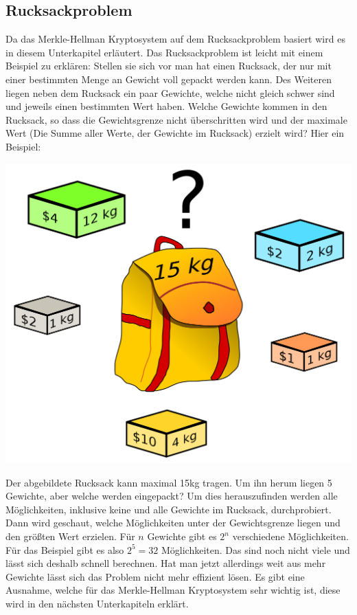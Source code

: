 \documentclass[a4paper,12pt,titlepage]{article}
\begin{document}
\subsection{Rucksackproblem}\label{rucksack}
Da das Merkle-Hellman Kryptosystem auf dem Rucksackproblem basiert wird es in diesem Unterkapitel erläutert. \newline Das Rucksackproblem ist leicht mit einem Beispiel zu erklären: Stellen sie sich vor man hat einen Rucksack, der nur mit einer bestimmten Menge an Gewicht voll gepackt werden kann. Des Weiteren liegen neben dem Rucksack ein paar Gewichte, welche nicht gleich schwer sind und jeweils einen bestimmten Wert haben. Welche Gewichte kommen in den Rucksack, so dass die Gewichtsgrenze nicht überschritten wird und der maximale Wert (Die Summe aller Werte, der Gewichte im Rucksack) erzielt wird? \newline
Hier ein Beispiel:
\begin{center}
\includegraphics[scale=0.2]{rucksackproblem.png} %
\end{center}
Der abgebildete Rucksack kann maximal 15kg tragen. Um ihn herum liegen 5 Gewichte, aber welche werden eingepackt? Um dies herauszufinden werden alle Möglichkeiten, inklusive keine und alle Gewichte im Rucksack, durchprobiert. Dann wird geschaut, welche Möglichkeiten unter der Gewichtsgrenze liegen und den größten Wert erzielen. Für $n$ Gewichte gibt es $2^{n}$ verschiedene Möglichkeiten. Für das Beispiel gibt es also $2^{5} = 32$ Möglichkeiten. Das sind noch nicht viele und lässt sich deshalb schnell berechnen. Hat man jetzt allerdings weit aus mehr Gewichte lässt sich das Problem nicht mehr effizient lösen. Es gibt eine Ausnahme, welche für das Merkle-Hellman Kryptosystem sehr wichtig ist, diese wird in den nächsten Unterkapiteln erklärt.
\end{document}
